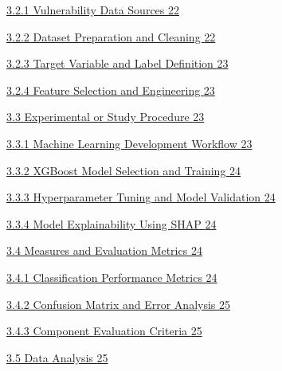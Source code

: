 \documentclass[
]{article}
\begin{document}
\protect\hyperlink{vulnerability-data-sources}{3.2.1 Vulnerability Data
Sources \protect\hyperlink{vulnerability-data-sources}{22}}

\protect\hyperlink{dataset-preparation-and-cleaning}{3.2.2 Dataset
Preparation and Cleaning
\protect\hyperlink{dataset-preparation-and-cleaning}{22}}

\protect\hyperlink{target-variable-and-label-definition}{3.2.3 Target
Variable and Label Definition
\protect\hyperlink{target-variable-and-label-definition}{23}}

\protect\hyperlink{feature-selection-and-engineering}{3.2.4 Feature
Selection and Engineering
\protect\hyperlink{feature-selection-and-engineering}{23}}

\protect\hyperlink{experimental-or-study-procedure}{3.3 Experimental or
Study Procedure \protect\hyperlink{experimental-or-study-procedure}{23}}

\protect\hyperlink{machine-learning-development-workflow}{3.3.1 Machine
Learning Development Workflow
\protect\hyperlink{machine-learning-development-workflow}{23}}

\protect\hyperlink{xgboost-model-selection-and-training}{3.3.2 XGBoost
Model Selection and Training
\protect\hyperlink{xgboost-model-selection-and-training}{24}}

\protect\hyperlink{hyperparameter-tuning-and-model-validation}{3.3.3
Hyperparameter Tuning and Model Validation
\protect\hyperlink{hyperparameter-tuning-and-model-validation}{24}}

\protect\hyperlink{model-explainability-using-shap}{3.3.4 Model
Explainability Using SHAP
\protect\hyperlink{model-explainability-using-shap}{24}}

\protect\hyperlink{measures-and-evaluation-metrics}{3.4 Measures and
Evaluation Metrics
\protect\hyperlink{measures-and-evaluation-metrics}{24}}

\protect\hyperlink{classification-performance-metrics}{3.4.1
Classification Performance Metrics
\protect\hyperlink{classification-performance-metrics}{24}}

\protect\hyperlink{confusion-matrix-and-error-analysis}{3.4.2 Confusion
Matrix and Error Analysis
\protect\hyperlink{confusion-matrix-and-error-analysis}{25}}

\protect\hyperlink{component-evaluation-criteria}{3.4.3 Component
Evaluation Criteria
\protect\hyperlink{component-evaluation-criteria}{25}}

\protect\hyperlink{data-analysis}{3.5 Data Analysis
\protect\hyperlink{data-analysis}{25}}
\end{document}
